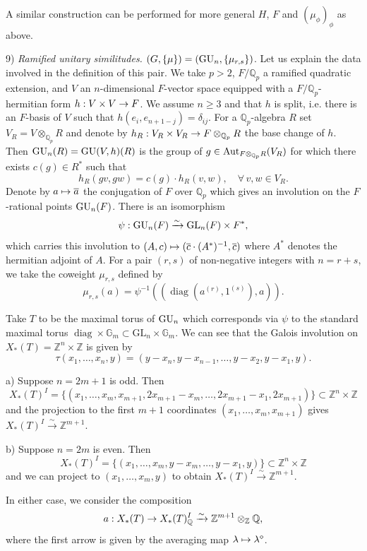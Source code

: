 \documentclass[reqno, 10pt]{amsart}
\makeatletter
\newcommand{\diam}{{\diamond}}
\newcommand{\BG}{\ensuremath{\mathbb {G}}\xspace}
\newcommand{\BQ}{\ensuremath{\mathbb {Q}}\xspace}
\newcommand{\BZ}{\ensuremath{\mathbb {Z}}\xspace}
\DeclareMathOperator{\diag}{diag}
\newcommand{\GL}{\mathrm{GL}}
\newcommand{\ov}{\overline}
\theoremstyle{definition}
\numberwithin{equation}{subsection}
\numberwithin{subsubsection}{subsection}
\renewcommand{\to}{%
   \ifbool{@display}{\longrightarrow}{\rightarrow}%
   }
\let\shortmapsto\mapsto
\renewcommand{\mapsto}{%
   \ifbool{@display}{\shortmapsto}{\shortmapsto}%
   }
\makeatother
\begin{document}
A similar construction can be performed for more general $H$, $F$ and $(\mu_\phi)_\phi$ as  above.

9)  \emph{Ramified unitary similitudes.} $(G, \{\mu\})=({\rm GU}_n, \{\mu_{r,s}\})$. Let us explain the data involved in the definition of this pair. We take $p>2$, $F/\BQ_p$ a ramified quadratic extension, and $V$ an $n$-dimensional $F$-vector space equipped with a $F/\BQ_p$-hermitian form $h: V\times V\to F$. We assume $n\geq 3$ and that $h$ is split, i.e. there is an $F$-basis of $V$ such that $h(e_i, e_{n+1-j})=\delta_{ij}$. For a $\BQ_p$-algebra $R$
set $V_R=V\otimes_{\BQ_p}R$ and denote by $h_R: V_R\times V_R\to F\otimes_{\BQ_p}R$   the base change of $h$. Then ${\rm GU}_n(R)={\rm GU}(V,h)(R)$ is the group of   $g\in {\rm Aut}_{F\otimes_{\BQ_p}R}(V_R)$ for which there exists  $c(g)\in R^*$ such that  
\[
h_R(gv, gw)=c(g)\cdot h_R(v,w),  \quad \forall\, v, w\in V_R.
\]
Denote by $a\mapsto \ov a$ the conjugation of $F$ over $\BQ_p$ which gives an involution on the $F$-rational points ${\rm GU}_n(F)$.  There is an isomorphism   
\[
\psi: {\rm GU}_n(F)\xrightarrow{\sim}\GL_n(F)\times F^*,
\]
which carries this involution
to 
$
(A, c)\mapsto (\ov c\cdot (A^*)^{-1}, \ov c)
$
where $A^*$ denotes the hermitian adjoint of $A$. For a pair $(r, s)$ of non-negative integers with $n=r+s$,  we take the coweight $\mu_{r,s}$ defined by 
\[
 \mu_{r,s}(a)=\psi^{-1}((\diag(a^{(r)}, 1^{(s)}), a)).
\]

Take $T$ to be the maximal torus of ${\rm GU}_n$ which corresponds via $\psi$ to the 
standard maximal torus $\diag\times \BG_m\subset \GL_n\times \BG_m$.  We can see that the Galois involution on $X_*(T)=\BZ^n\times \BZ$ is given by
\[
\tau(x_1,\ldots, x_n, y)=(y-x_n, y-x_{n-1},\ldots, y-x_2, y-x_1,y).
\]

 a) Suppose $n=2m+1$ is odd. 
Then 
\[
X_*(T)^I=\{(x_1,\ldots, x_m, x_{m+1},2x_{m+1}-x_m,\ldots, 2x_{m+1}-x_1, 2x_{m+1})\}\subset \BZ^n\times\BZ
\]
and the projection to the first $m+1$ coordinates $(x_1,\ldots, x_m, x_{m+1})$ gives $X_*(T)^I\xrightarrow{\sim} \BZ^{m+1}$.

b) Suppose $n=2m$ is even. Then 
\[
X_*(T)^I=\{(x_1,\ldots, x_m,y-x_m,\ldots, y-x_1, y)\}\subset \BZ^n\times\BZ
\]
and we can project to $(x_1,\ldots, x_m, y)$ to obtain $X_*(T)^I\xrightarrow{\sim} \BZ^{m+1}$.

In either case, we consider the composition
\[
a: X_*(T)\to X_*(T)^I_\BQ\xrightarrow{\sim}\BZ^{m+1}\otimes_\BZ\BQ,
\]
where the first arrow is given by the averaging map $\lambda\mapsto \lambda^\diam$.
\end{document}
